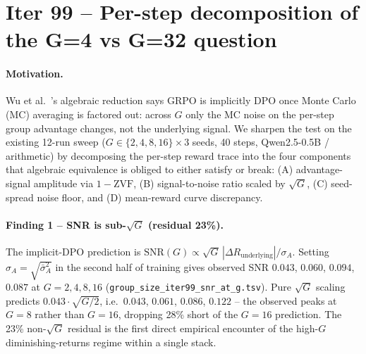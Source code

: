 \section{Iter 99 -- Per-step decomposition of the G=4 vs G=32 question}
\label{sec:group-size-iter99}

\paragraph{Motivation.}
Wu et al.~\cite{wu2025grpo_dpo}'s algebraic reduction says GRPO is
implicitly DPO once Monte Carlo (MC) averaging is factored out: across
$G$ only the MC noise on the per-step group advantage changes, not the
underlying signal.  We sharpen the test on the existing
12-run sweep ($G{\in}\{2,4,8,16\}\times 3$ seeds, 40 steps,
Qwen2.5-0.5B / arithmetic) by decomposing the per-step reward trace
into the four components that algebraic equivalence is obliged to
either satisfy or break: (A) advantage-signal amplitude via
$1-\mathrm{ZVF}$, (B) signal-to-noise ratio scaled by $\sqrt{G}$,
(C) seed-spread noise floor, and (D) mean-reward curve discrepancy.

\paragraph{Finding 1 -- SNR is sub-$\sqrt{G}$ (residual 23\%).}
The implicit-DPO prediction is $\mathrm{SNR}(G) \propto \sqrt{G}
\,|\Delta R_{\mathrm{underlying}}| / \sigma_A$.  Setting
$\sigma_A = \sqrt{\bar\sigma_A^2}$ in the second half of training
gives observed SNR $0.043$, $0.060$, $0.094$, $0.087$
at $G{=}2,4,8,16$ (\texttt{group\_size\_iter99\_snr\_at\_g.tsv}).
Pure $\sqrt{G}$ scaling predicts $0.043 \cdot \sqrt{G/2}$, i.e.\
$0.043$, $0.061$, $0.086$, $0.122$ -- the observed peaks at $G{=}8$
rather than $G{=}16$, dropping 28\% short of the $G{=}16$ prediction.
The 23\% non-$\sqrt{G}$ residual is the first direct empirical
encounter of the high-$G$ diminishing-returns regime within a single
stack.

